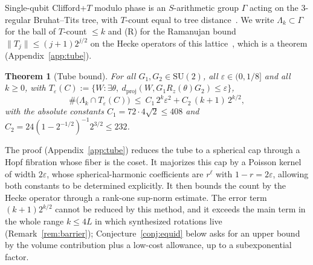 \documentclass[aps,prx,twocolumn,superscriptaddress,nofootinbib,longbibliography]{revtex4-2}
\theoremstyle{plain}
\newtheorem{theorem}{Theorem}
\theoremstyle{definition}
\theoremstyle{remark}
\newcommand{\dproj}{d_{\mathrm{proj}}}
\newcommand{\SU}{\mathrm{SU}(2)}
\begin{document}
Single-qubit Clifford+$T$ modulo phase is an $S$-arithmetic group $\Gamma$ acting on the $3$-regular Bruhat--Tits tree, with $T$-count equal to tree distance~\cite{KMM13,PS18}. We write $\Lambda_k\subset\Gamma$ for the ball of $T$-count $\le k$ and (R) for the Ramanujan bound $\|T_j\|\le(j+1)2^{j/2}$ on the Hecke operators of this lattice~\cite{LPS,PS18}, which is a theorem (Appendix~\ref{app:tube}).


\begin{theorem}[Tube bound]\label{thm:tube}
For all $G_1,G_2\in\SU$, all $\varepsilon\in(0,1/8]$ and all $k\ge0$, with
$T_\varepsilon(C):=\{W:\exists\theta,\ \dproj(W,G_1R_z(\theta)G_2)\le\varepsilon\}$,
\begin{equation}\label{eq:tube}
\#\big(\Lambda_k\cap T_\varepsilon(C)\big)\ \le\ C_1\,2^k\varepsilon^2+C_2\,(k+1)\,2^{k/2},
\end{equation}
with the absolute constants $C_1=72\cdot4\sqrt2\le408$ and $C_2=24(1-2^{-1/2})^{-1}2^{3/2}\le232$.
\end{theorem}
The proof (Appendix~\ref{app:tube}) reduces the tube to a spherical cap through a Hopf fibration whose fiber is the coset. It majorizes this cap by a Poisson kernel of width $2\varepsilon$, whose spherical-harmonic coefficients are $r^\ell$ with $1-r=2\varepsilon$, allowing both constants to be determined explicitly. It then bounds the count by the Hecke operator through a rank-one sup-norm estimate.
The error term $(k+1)2^{k/2}$ cannot be reduced by this method, and it exceeds the main term in the whole range $k\le4L$ in which synthesized rotations live (Remark~\ref{rem:barrier}); Conjecture~\ref{conj:equid} below asks for an upper bound by the volume contribution plus a low-cost allowance, up to a subexponential factor.
\end{document}
